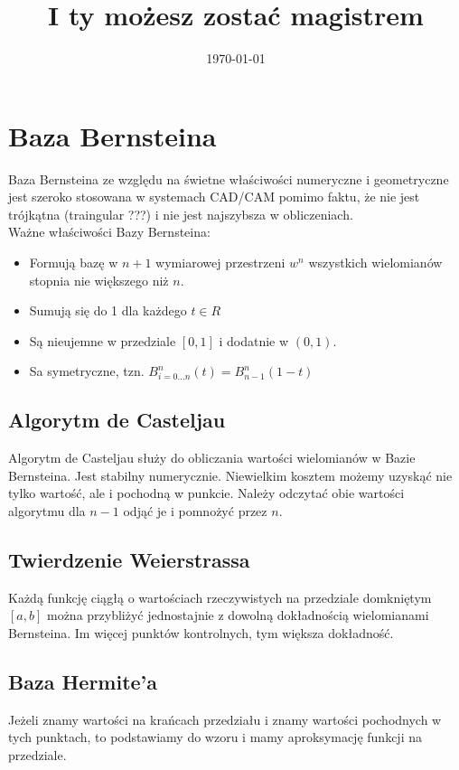 \documentclass[12pt]{article}
\title{I ty możesz zostać magistrem}
\date{\today}
\begin{document}
	
\maketitle
\tableofcontents

\section{Baza Bernsteina}
Baza Bernsteina ze względu na świetne właściwości numeryczne i geometryczne jest szeroko stosowana w systemach CAD/CAM pomimo faktu, że nie jest trójkątna (traingular ???) i nie jest najszybsza w obliczeniach.\\

Ważne właściwości Bazy Bernsteina:
\begin{itemize}
	\item Formują bazę w $n+1$ wymiarowej przestrzeni $w^{n}$ wszystkich wielomianów stopnia nie większego niż $n$.
	\item Sumują się do 1 dla każdego $t \in R$
	\item Są nieujemne w przedziale $[0,1]$ i dodatnie w $(0,1)$.
	\item Sa symetryczne, tzn. $B^{n}_{i=0...n}(t) = B^{n}_{n-1}(1-t)$
\end{itemize}

\subsection{Algorytm de Casteljau}
Algorytm de Casteljau służy do obliczania wartości wielomianów w Bazie Bernsteina. Jest stabilny numerycznie. 
Niewielkim kosztem możemy uzyskąć nie tylko wartość, ale i pochodną w punkcie. Należy odczytać obie wartości algorytmu dla $n-1$ odjąć je i pomnożyć przez $n$.

\subsection{Twierdzenie Weierstrassa}
Każdą funkcję ciągłą o wartościach rzeczywistych na przedziale domkniętym $[a,b]$ można przybliżyć jednostajnie z dowolną dokładnością wielomianami Bernsteina. Im więcej punktów kontrolnych, tym większa dokładność.

\subsection{Baza Hermite'a}
Jeżeli znamy wartości na krańcach przedziału i znamy wartości pochodnych w tych punktach, to podstawiamy do wzoru i mamy aproksymację funkcji na przedziale.
\end{document}
